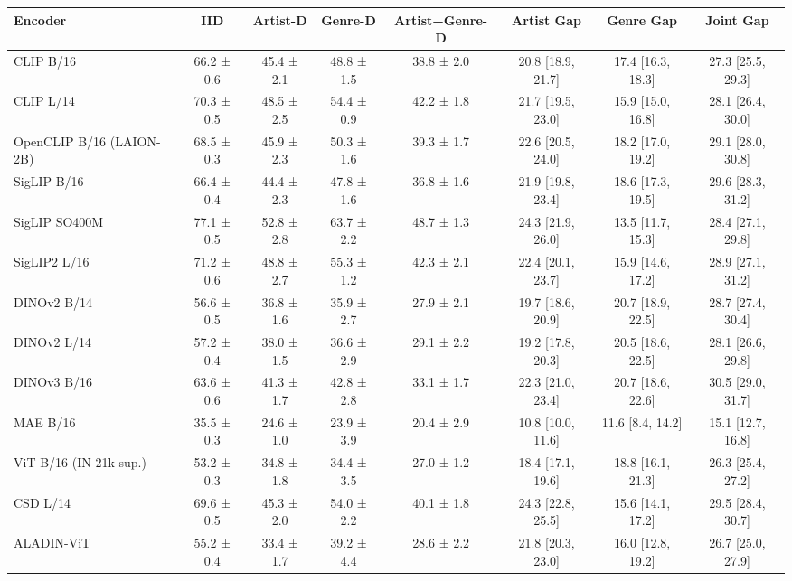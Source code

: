 \begin{tabular}{lccccccc}
\toprule
Encoder & IID & Artist-D & Genre-D & Artist+Genre-D & Artist Gap & Genre Gap & Joint Gap \\
\midrule
CLIP B/16 & 66.2 ± 0.6 & 45.4 ± 2.1 & 48.8 ± 1.5 & 38.8 ± 2.0 & 20.8 [18.9, 21.7] & 17.4 [16.3, 18.3] & 27.3 [25.5, 29.3] \\
CLIP L/14 & 70.3 ± 0.5 & 48.5 ± 2.5 & 54.4 ± 0.9 & 42.2 ± 1.8 & 21.7 [19.5, 23.0] & 15.9 [15.0, 16.8] & 28.1 [26.4, 30.0] \\
OpenCLIP B/16 (LAION-2B) & 68.5 ± 0.3 & 45.9 ± 2.3 & 50.3 ± 1.6 & 39.3 ± 1.7 & 22.6 [20.5, 24.0] & 18.2 [17.0, 19.2] & 29.1 [28.0, 30.8] \\
SigLIP B/16 & 66.4 ± 0.4 & 44.4 ± 2.3 & 47.8 ± 1.6 & 36.8 ± 1.6 & 21.9 [19.8, 23.4] & 18.6 [17.3, 19.5] & 29.6 [28.3, 31.2] \\
SigLIP SO400M & 77.1 ± 0.5 & 52.8 ± 2.8 & 63.7 ± 2.2 & 48.7 ± 1.3 & 24.3 [21.9, 26.0] & 13.5 [11.7, 15.3] & 28.4 [27.1, 29.8] \\
SigLIP2 L/16 & 71.2 ± 0.6 & 48.8 ± 2.7 & 55.3 ± 1.2 & 42.3 ± 2.1 & 22.4 [20.1, 23.7] & 15.9 [14.6, 17.2] & 28.9 [27.1, 31.2] \\
DINOv2 B/14 & 56.6 ± 0.5 & 36.8 ± 1.6 & 35.9 ± 2.7 & 27.9 ± 2.1 & 19.7 [18.6, 20.9] & 20.7 [18.9, 22.5] & 28.7 [27.4, 30.4] \\
DINOv2 L/14 & 57.2 ± 0.4 & 38.0 ± 1.5 & 36.6 ± 2.9 & 29.1 ± 2.2 & 19.2 [17.8, 20.3] & 20.5 [18.6, 22.5] & 28.1 [26.6, 29.8] \\
DINOv3 B/16 & 63.6 ± 0.6 & 41.3 ± 1.7 & 42.8 ± 2.8 & 33.1 ± 1.7 & 22.3 [21.0, 23.4] & 20.7 [18.6, 22.6] & 30.5 [29.0, 31.7] \\
MAE B/16 & 35.5 ± 0.3 & 24.6 ± 1.0 & 23.9 ± 3.9 & 20.4 ± 2.9 & 10.8 [10.0, 11.6] & 11.6 [8.4, 14.2] & 15.1 [12.7, 16.8] \\
ViT-B/16 (IN-21k sup.) & 53.2 ± 0.3 & 34.8 ± 1.8 & 34.4 ± 3.5 & 27.0 ± 1.2 & 18.4 [17.1, 19.6] & 18.8 [16.1, 21.3] & 26.3 [25.4, 27.2] \\
CSD L/14 & 69.6 ± 0.5 & 45.3 ± 2.0 & 54.0 ± 2.2 & 40.1 ± 1.8 & 24.3 [22.8, 25.5] & 15.6 [14.1, 17.2] & 29.5 [28.4, 30.7] \\
ALADIN-ViT & 55.2 ± 0.4 & 33.4 ± 1.7 & 39.2 ± 4.4 & 28.6 ± 2.2 & 21.8 [20.3, 23.0] & 16.0 [12.8, 19.2] & 26.7 [25.0, 27.9] \\
\bottomrule
\end{tabular}
